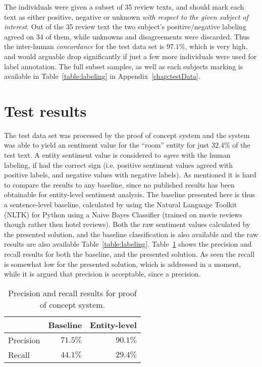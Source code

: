 The individuals were given a subset of 35 review texts, and should mark each text as either positive, negative or unknown \emph{with respect to the given subject of interest}. Out of the 35 review text the two subject's positive/negative labeling agreed on 34 of them, while unknowns and disagreements were discarded. Thus the inter-human \emph{concordance} for the test data set is $97.1\%$, which is very high, and would arguable drop significantly if just a few more individuals were used for label annotation. The full subset samples, as well as each subjects marking is available in Table~\ref{table:labeling} in Appendix~\ref{chap:testData}.

\section{Test results}
The test data set was processed by the proof of concept system and the system was able to yield an sentiment value for the ``room'' entity for just $32.4\%$ of the test text. A entity sentiment value is considered to \emph{agree} with the human labeling, if had the correct sign (i.e. positive sentiment values agreed with positive labels, and negative values with negative labels). As mentioned it is hard to compare the results to any baseline, since no published results has been obtainable for entity-level sentiment analysis. The baseline presented here is thus a sentence-level baseline, calculated by using the Natural Language Toolkit (NLTK) for Python using a Naive Bayes Classifier (trained on movie reviews though rather then hotel reviews). Both the raw sentiment values calculated by the presented solution, and the baseline classification is also available and the raw results are also available Table~\ref{table:labeling}. Table~\ref{table:results} shows the precision and recall results for both the baseline, and the presented solution. As seen the recall is somewhat low for the presented solution, which is addressed in a moment, while it is argued that precision is acceptable, since a precision. 
\begin{table}[ht]
\center
\begin{tabular}{l|rr}
	          & Baseline & Entity-level \\ \hline
	Precision & $71.5\%$ & $90.1\%$ \\
	Recall    & $44.1\%$ & $29.4\%$ 
\end{tabular}
\caption{Precision and recall results for proof of concept system.}
\label{table:results}
\end{table}